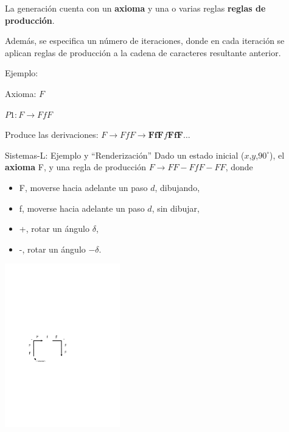 \documentclass[spanish]{beamer}
\begin{document}
\begin{frame}

La generación cuenta con un \textbf{axioma} y una o varias reglas \textbf{reglas de producción}.

Además, se especifica un número de iteraciones, donde en cada iteración se aplican reglas de producción a la cadena de caracteres resultante anterior.

\vspace{1cm}

Ejemplo:

Axioma: $F$

$P1: F \rightarrow FfF$

Produce las derivaciones:
$F \rightarrow FfF \rightarrow \textbf{FfF}f\textbf{FfF} \ldots$

\end{frame}

\begin{frame}{Sistemas-L: Ejemplo y ``Renderización''}
Dado un estado inicial ($x$,$y$,$90^{\circ}$), el \textbf{axioma} F, y una regla de producción $F \rightarrow FF-FfF-FF$, donde

\begin{itemize}
\item F, moverse hacia adelante un paso $d$, dibujando,
\item f, moverse hacia adelante un paso $d$, sin dibujar,
\item +, rotar un ángulo $\delta$,
\item -, rotar un ángulo $-\delta$.
\end{itemize}

\center
\includegraphics[width=5cm]{../figures/tortuga}

\end{frame}
\end{document}
